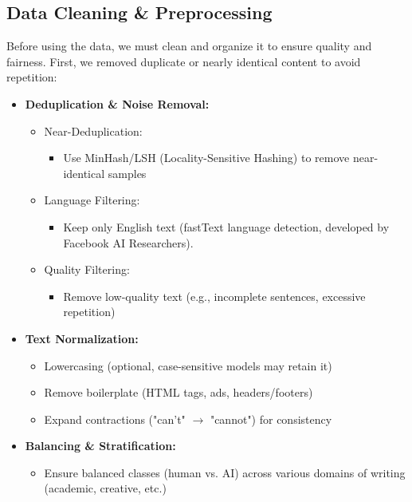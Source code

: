 \documentclass{article} %
\begin{document}
\subsection{Data Cleaning \& Preprocessing}
Before using the data, we must clean and organize it to ensure quality and fairness. First, we removed duplicate or nearly identical content to avoid repetition:
\begin{itemize}
    \item \textbf{Deduplication \& Noise Removal:}
    \begin{itemize}
        \item Near-Deduplication:
        \begin{itemize}
            \item Use MinHash/LSH (Locality-Sensitive Hashing) to remove near-identical samples
        \end{itemize}
        
        \item Language Filtering:
        \begin{itemize}
            \item Keep only English text (fastText language detection, developed by Facebook AI Researchers).
        \end{itemize}
        
        \item Quality Filtering:
        \begin{itemize}
            \item Remove low-quality text (e.g., incomplete sentences, excessive repetition)
        \end{itemize}
    \end{itemize}
    
    \item \textbf{Text Normalization:}
    \begin{itemize}
        \item Lowercasing (optional, case-sensitive models may retain it)
        \item Remove boilerplate (HTML tags, ads, headers/footers)
        \item Expand contractions ("can't" $\rightarrow$ "cannot") for consistency
    \end{itemize}
    
    \item \textbf{Balancing \& Stratification:}
    \begin{itemize}
        \item Ensure balanced classes (human vs. AI) across various domains of writing (academic, creative, etc.)
    \end{itemize}
\end{itemize}
\end{document}
